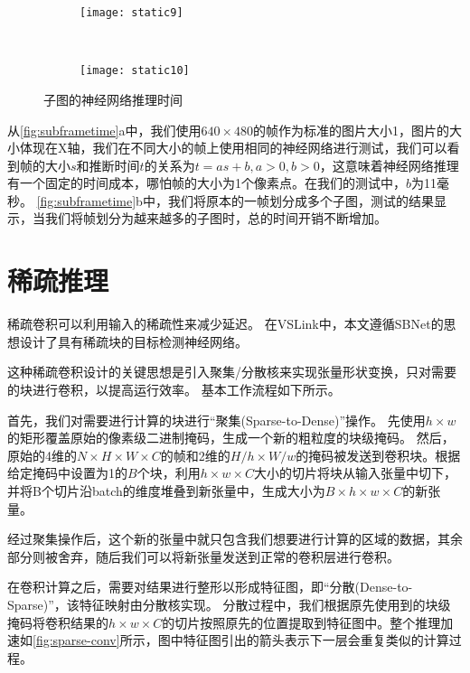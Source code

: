 \begin{figure}[htbp]
	\centering
	\begin{subfigure}{.48\linewidth}
		\texttt{[image: static9]}
		\caption{}
	\end{subfigure}
	\ 
	\begin{subfigure}{.48\linewidth}
		\texttt{[image: static10]}
		\caption{}
	\end{subfigure}
	\caption{子图的神经网络推理时间}\label{fig:subframetime}
\end{figure}

从\autoref{fig:subframetime}a中，我们使用$640\times 480$的帧作为标准的图片大小1，图片的大小体现在X轴，我们在不同大小的帧上使用相同的神经网络进行测试，我们可以看到帧的大小$s$和推断时间$t$的关系为$t = as + b, a>0,b >0$，这意味着神经网络推理有一个固定的时间成本，哪怕帧的大小为1个像素点。在我们的测试中，$b$为11毫秒。
\autoref{fig:subframetime}b中，我们将原本的一帧划分成多个子图，测试的结果显示，当我们将帧划分为越来越多的子图时，总的时间开销不断增加。

 
\section{稀疏推理}
稀疏卷积\cite{graham2015sparse,ren2018sbnet}可以利用输入的稀疏性来减少延迟。
在VSLink中，本文遵循SBNet\cite{ren2018sbnet}的思想设计了具有稀疏块的目标检测神经网络。

这种稀疏卷积设计\cite{ren2018sbnet}的关键思想是引入聚集/分散核来实现张量形状变换，只对需要的块进行卷积，以提高运行效率。
基本工作流程如下所示。

首先，我们对需要进行计算的块进行“聚集(Sparse-to-Dense)”操作。
先使用$h\times w$的矩形覆盖原始的像素级二进制掩码，生成一个新的粗粒度的块级掩码。
然后，原始的4维的$N \times H \times W \times C$的帧和2维的$H/h \times W/w$的掩码被发送到卷积块。根据给定掩码中设置为1的$B$个块，利用$h\times w \times C$大小的切片将块从输入张量中切下，并将B个切片沿batch的维度堆叠到新张量中，生成大小为$B\times h \times w \times C$的新张量。

经过聚集操作后，这个新的张量中就只包含我们想要进行计算的区域的数据，其余部分则被舍弃，随后我们可以将新张量发送到正常的卷积层进行卷积。

在卷积计算之后，需要对结果进行整形以形成特征图，即“分散(Dense-to-Sparse)”，该特征映射由分散核实现。
分散过程中，我们根据原先使用到的块级掩码将卷积结果的$h\times w \times C$的切片按照原先的位置提取到特征图中。整个推理加速如\autoref{fig:sparse-conv}所示，图中特征图引出的箭头表示下一层会重复类似的计算过程。

